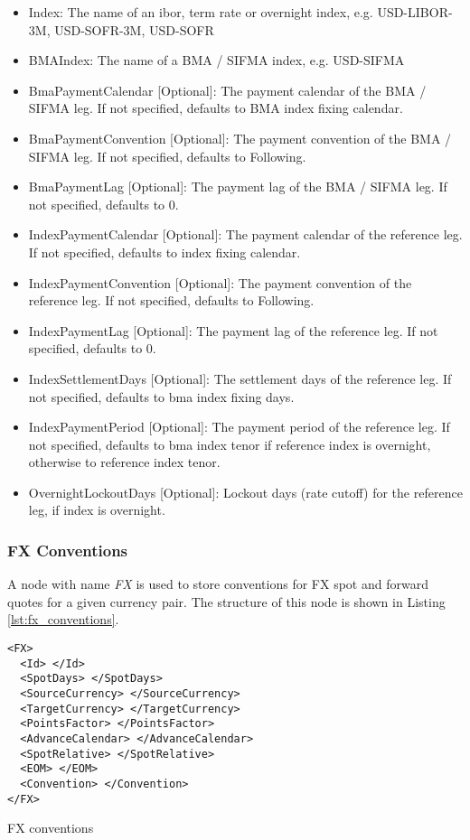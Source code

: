 \begin{itemize}
\item Index: The name of an ibor, term rate or overnight index, e.g. USD-LIBOR-3M, USD-SOFR-3M, USD-SOFR
\item BMAIndex: The name of a BMA / SIFMA index, e.g. USD-SIFMA
\item BmaPaymentCalendar [Optional]: The payment calendar of the BMA / SIFMA leg. If not specified, defaults to BMA index fixing calendar.
\item BmaPaymentConvention [Optional]: The payment convention of the BMA / SIFMA leg. If not specified, defaults to Following.
\item BmaPaymentLag [Optional]: The payment lag of the BMA / SIFMA leg. If not specified, defaults to $0$.
\item IndexPaymentCalendar [Optional]: The payment calendar of the reference leg. If not specified, defaults to index fixing calendar.
\item IndexPaymentConvention [Optional]: The payment convention of the reference leg. If not specified, defaults to Following.
\item IndexPaymentLag [Optional]: The payment lag of the reference leg. If not specified, defaults to $0$.
\item IndexSettlementDays [Optional]: The settlement days of the reference leg. If not specified, defaults to bma index fixing days.
\item IndexPaymentPeriod [Optional]: The payment period of the reference leg. If not specified, defaults to bma index
  tenor if reference index is overnight, otherwise to reference index tenor.
\item OvernightLockoutDays [Optional]: Lockout days (rate cutoff) for the reference leg, if index is overnight.
\end{itemize}

\subsubsection{FX Conventions}\label{sss:fx_convention}
A node with name \emph{FX} is used to store conventions for FX spot and forward quotes for a given currency pair. The
structure of this node is shown in Listing \ref{lst:fx_conventions}.

\begin{listing}[H]
\begin{verbatim}
<FX>
  <Id> </Id>
  <SpotDays> </SpotDays>
  <SourceCurrency> </SourceCurrency>
  <TargetCurrency> </TargetCurrency>
  <PointsFactor> </PointsFactor>
  <AdvanceCalendar> </AdvanceCalendar>
  <SpotRelative> </SpotRelative>
  <EOM> </EOM>
  <Convention> </Convention>
</FX>
\end{verbatim}
\caption{FX conventions}
\label{lst:fx_conventions}
\end{listing}



